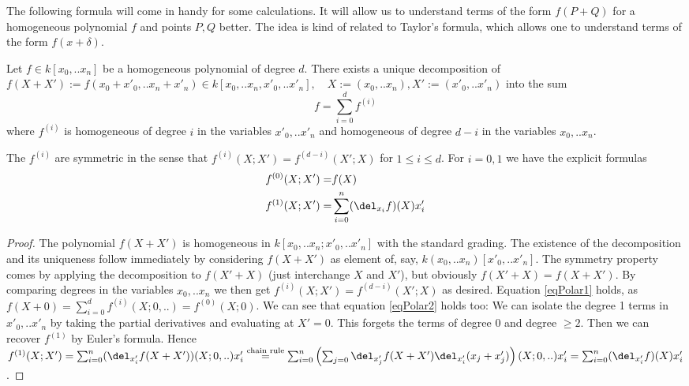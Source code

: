 The following formula will come in handy for some calculations.
It will allow us to understand terms of the form $f(P+Q)$ for a homogeneous polynomial $f$ and points $P,Q$ better.
The idea is kind of related to Taylor's formula, which allows one to understand terms of the form $f(x + \delta)$.
\begin{proposition} \label{propositionTaylor}
Let $f \in k[x_0,..x_n]$ be a homogeneous polynomial of degree $d$.
There exists a unique decomposition of $f(X+X') := f(x_0+x'_0,..x_n+x'_n) \in k[x_0,..x_n,x'_0,..x'_n], \quad X := (x_0,..x_n), X' := (x'_0,..x'_n)$ into the sum
\begin{equation}
f = \sum_{i=0}^d f^{(i)}
\end{equation}
where $f^{(i)}$ is homogeneous of degree $i$ in the variables $x'_0,..x'_n$ and homogeneous of degree $d-i$ in the variables $x_0,..x_n$.

The $f^{(i)}$ are symmetric in the sense that $f^{(i)}(X;X') = f^{(d-i)}(X';X)$ for $1 \leq i \leq d$.
For $i = 0,1$ we have the explicit formulas
\begin{align}
f^{(0)}(X;X') =& f(X)  \label{eqPolar1}
\\ f^{(1)}(X;X') =& \sum_{i=0}^n (\del_{x_i}f)(X) x'_i \label{eqPolar2}
\end{align}
\end{proposition}
\begin{proof}
The polynomial $f(X+X')$ is homogeneous in $k[x_0,..x_n;x'_0,..x'_n]$ with the standard grading.
The existence of the decomposition and its uniqueness follow immediately by considering $f(X+X')$ as element of, say, $k(x_0,..x_n)[x'_0,..x'_n]$.
The symmetry property comes by applying the decomposition to $f(X'+X)$ (just interchange $X$ and $X'$), but obviously $f(X'+X) = f(X+X')$.
By comparing degrees in the variables $x_0,..x_n$ we then get $f^{(i)}(X;X') = f^{(d-i)}(X';X)$ as desired.
Equation \ref{eqPolar1} holds, as $f(X+0) = \sum_{i=0}^d f^{(i)}(X;0,..) = f^{(0)}(X;0)$.
We can see that equation \ref{eqPolar2} holds too:
We can isolate the degree 1 terms in $x'_0,..x'_n$ by taking the partial derivatives and evaluating at $X'=0$.
This forgets the terms of degree 0 and degree $\geq 2$.
Then we can recover $f^{(1)}$ by Euler's formula.
Hence $f^{(1)}(X;X') = \sum_{i=0}^n (\del_{x'_i}f(X+X'))(X;0,..) x'_i
\overset{\text{chain rule}}= \sum_{i=0}^n \left( \sum_{j=0} \del_{x'_j}f(X+X') \del_{x'_i}(x_j + x'_j) \right)(X;0,..)x'_i = \sum_{i=0}^n (\del_{x'_i} f)(X) x'_i$.
\end{proof}

